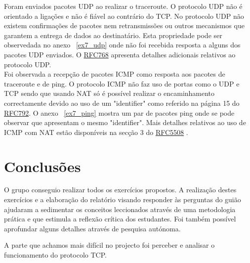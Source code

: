 \documentclass[11pt,a4paper,reqno]{report}
\numberwithin{equation}{section}
\begin{document}
Foram enviados pacotes UDP ao realizar o traceroute. O protocolo UDP não é orientado a ligações e não é fiável ao contrário do TCP. No protocolo UDP não existem confirmações de pacotes nem retransmissões ou outros mecanismos que garantem a entrega de dados ao destinatário. Esta propriedade pode ser observedada no anexo ~\ref{ex7_udp} onde não foi recebida resposta a alguns dos pacotes UDP enviados. O \href{https://www.ietf.org/rfc/rfc768.txt}{RFC768} apresenta detalhes adicionais relativos ao protocolo UDP.\\

Foi observada a recepção de pacotes ICMP como resposta aos pacotes de traceroute e de ping. O protocolo ICMP não faz uso de portas como o UDP e TCP sendo que usando NAT só é possível realizar o encaminhamento correctamente devido ao uso de um "identifier" como referido na página 15 do \href{https://www.ietf.org/rfc/rfc792.txt}{RFC792}. O anexo ~\ref{ex7_ping} mostra um par de pacotes ping onde se pode observar que apresentam o mesmo "identifier". Mais detalhes relativos ao uso de ICMP com NAT estão disponíveis na secção 3 do \href{https://www.ietf.org/rfc/rfc5508.txt}{RFC5508} . 

\chapter{Conclusões}

O grupo conseguio realizar todos os exercícios propostos. A realização destes exercícios e a elaboração do relatório visando responder às perguntas do guião ajudaram a sedimentar os conceitos leccionados através de uma metodologia prática e que estimula a reflexão crítica dos estudantes. Foi também possível aprofundar alguns detalhes através de pesquisa autónoma. 

A parte que achamos mais difícil no projecto foi perceber e analisar o funcionamento do protocolo TCP.


\end{document}
